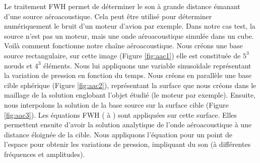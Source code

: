 Le traitement FWH permet de déterminer le son à grande distance émanant d'une source aéroacoustique. Cela peut être utilisé pour déterminer numériquement le bruit d'un moteur d'avion par exemple.
Dans notre cas test, la source n'est pas un moteur, mais une onde aéroacoustique simulée dans un cube.
Voilà comment fonctionne notre chaîne aéroacoustique.\label{s243}
Nous créons une base source rectangulaire, sur cette image (Figure \ref{fig:aac1}) elle est constituée de $5^3$ nœuds et $4^3$ éléments.
Nous lui appliquons une variable sinusoïdale représentant la variation de pression en fonction du temps.
Nous créons en parallèle une base cible sphérique (Figure \ref{fig:aac2}), représentant la surface que nous créons dans le maillage de la solution englobant l'objet étudié (le moteur par exemple).
Ensuite, nous interpolons la solution de la base source sur la surface cible (Figure \ref{fig:aac3}).
Les équations FWH ( à ) sont appliquées sur cette surface. Elles permettent ensuite d'avoir la solution analytique de l'onde aéroacoustique à une distance éloignée de la cible. Nous appliquons l'équation pour un point de l'espace pour obtenir les variations de pression, impliquant du son (à différentes fréquences et amplitudes).

